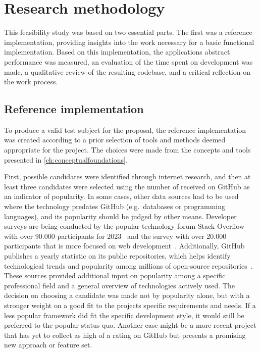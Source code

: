 \chapter{Research methodology}
\label{ch:methodology}

This feasibility study was based on two essential parts.
The first was a reference implementation, providing insights into the work necessary for a basic functional implementation.
Based on this implementation, the application\textquotesingle s abstract performance was measured, an evaluation of the time spent on development was made, a qualitative review of the resulting codebase, and a critical reflection on the work process.

\section{Reference implementation}
\label{sec:reference-implementation}

To produce a valid test subject for the proposal, the reference implementation was created according to a prior selection of tools and methods deemed appropriate for the project.
The choices were made from the concepts and tools presented in \autoref{ch:conceptualfoundations}.

First, possible candidates were identified through internet research, and then at least three candidates were selected using the number of  received on GitHub as an indicator of popularity.
In some cases, other data sources had to be used where the technology predates GitHub (e.g.\ databases or programming languages), and its popularity should be judged by other means.
Developer surveys are being conducted by the popular technology forum Stack Overflow with over 90.000 participants for 2023~\parencite{stackOverflowPoll} and the  survey with over 20.000 participants that is more focused on web development~\parencite{stateOfJSSurvey}.
Additionally, GitHub publishes a yearly statistic on its public repositories, which helps identify technological trends and popularity among millions of open-source repositories~\parencite{stateOfTheOctoverse23}.
These sources provided additional input on popularity among a specific professional field and a general overview of technologies actively used.
The decision on choosing a candidate was made not by popularity alone, but with a stronger weight on a good fit to the project\textquotesingle s specific requirements and needs.
If a less popular framework did fit the specific development style, it would still be preferred to the popular status quo.
Another case might be a more recent project that has yet to collect as high of a rating on GitHub but presents a promising new approach or feature set.

